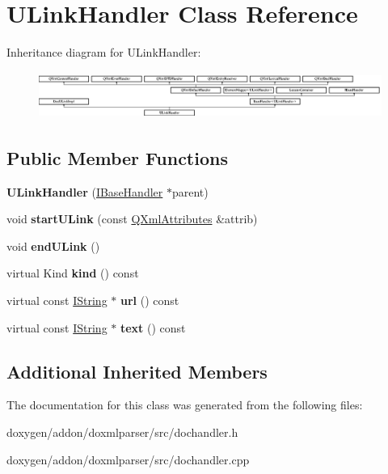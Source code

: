 \hypertarget{class_u_link_handler}{}\section{U\+Link\+Handler Class Reference}
\label{class_u_link_handler}
Inheritance diagram for U\+Link\+Handler\+:\begin{figure}[H]
\begin{center}
\leavevmode
\includegraphics[height=1.538461cm]{class_u_link_handler}
\end{center}
\end{figure}
\subsection*{Public Member Functions}
\begin{DoxyCompactItemize}
\item 
\mbox{\label{class_u_link_handler_ae3f3c61e138f689d647b2e5575956ff8}} 
{\bfseries U\+Link\+Handler} (\mbox{\hyperlink{class_i_base_handler}{I\+Base\+Handler}} $\ast$parent)
\item 
\mbox{\label{class_u_link_handler_a401dcabd62c09b839e47f852dd27b115}} 
void {\bfseries start\+U\+Link} (const \mbox{\hyperlink{class_q_xml_attributes}{Q\+Xml\+Attributes}} \&attrib)
\item 
\mbox{\label{class_u_link_handler_a6dd2187cc14ef7f176e7d4bce34f0f74}} 
void {\bfseries end\+U\+Link} ()
\item 
\mbox{\label{class_u_link_handler_a823bda1bff6427f3ac658a2c9c61750c}} 
virtual Kind {\bfseries kind} () const
\item 
\mbox{\label{class_u_link_handler_a3f29ef8d048b9631b3db58697d61ffc9}} 
virtual const \mbox{\hyperlink{class_i_string}{I\+String}} $\ast$ {\bfseries url} () const
\item 
\mbox{\label{class_u_link_handler_ad055c7d1485db8ffa9c2f84e34ef4810}} 
virtual const \mbox{\hyperlink{class_i_string}{I\+String}} $\ast$ {\bfseries text} () const
\end{DoxyCompactItemize}
\subsection*{Additional Inherited Members}


The documentation for this class was generated from the following files\+:\begin{DoxyCompactItemize}
\item 
doxygen/addon/doxmlparser/src/dochandler.\+h\item 
doxygen/addon/doxmlparser/src/dochandler.\+cpp\end{DoxyCompactItemize}
